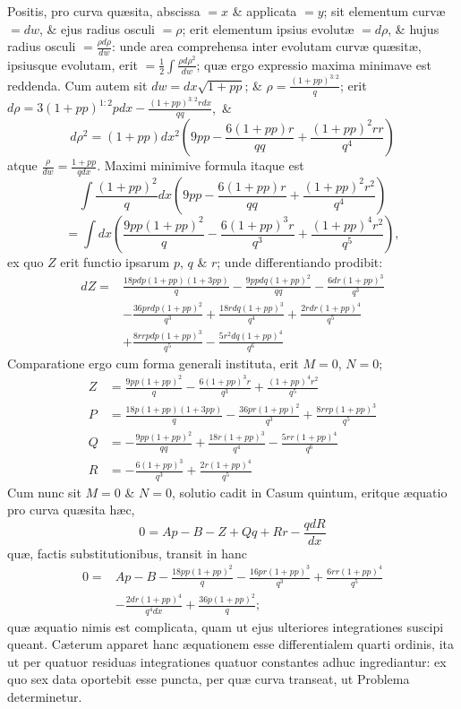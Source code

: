 Positis, pro curva quæsita, abscissa $=x$ \& applicata $=y$; sit elementum curvæ $=dw$, \& ejus radius osculi $=\rho$; erit elementum ipsius evolutæ $=d\rho$, \& hujus radius osculi $=\frac{\rho d\rho}{dw}$: unde area comprehensa inter evolutam curvæ quæsitæ, ipsiusque evolutam, erit $=\frac12\int\frac{\rho d\rho^2}{dw}$; quæ ergo expressio maxima minimave est reddenda. Cum autem sit $dw=dx\sqrt{1+pp}$; \& $\rho=\frac{(1+pp)^{3:2}}q$; erit $d\rho=3(1+pp)^{1:2}pdx-\frac{(1+pp)^{3:2}rdx}{qq}$,~\&
\[d\rho^2=(1+pp)dx^2\left(9pp-\frac{6(1+pp)r}{qq}+\frac{(1+pp)^2rr}{q^4}\right)\]
atque $\frac\rho{dw}=\frac{1+pp}{qdx}$. Maximi minimive formula itaque est
\[\int\frac{(1+pp)^2}{q}dx\left(9pp-\frac{6(1+pp)r}{qq}+\frac{(1+pp)^2r^2}{q^4}\right)\]
\[=\int dx\left(\frac{9pp(1+pp)^2}{q}-\frac{6(1+pp)^3r}{q^3}+\frac{(1+pp)^4r^2}{q^5}\right),\]
ex quo $Z$ erit functio ipsarum $p$, $q$ \& $r$; unde differentiando prodibit:
\[\begin{aligned}
dZ={}&\frac{18pdp(1+pp)(1+3pp)}q-\frac{9ppdq(1+pp)^2}{qq}-\frac{6dr(1+pp)^3}{q^3}\\
&-\frac{36prdp(1+pp)^2}{q^3}+\frac{18rdq(1+pp)^3}{q^4}+\frac{2rdr(1+pp)^4}{q^5}\\
&+\frac{8rrpdp(1+pp)^3}{q^5}-\frac{5r^2dq(1+pp)^4}{q^6}
\end{aligned}\]
Comparatione ergo cum forma generali instituta, erit $M=0$, $N=0$;
\[\begin{aligned}
Z&=\frac{9pp(1+pp)^2}{q}-\frac{6(1+pp)^3r}{q^3}+\frac{(1+pp)^4r^2}{q^5}\\
P&=\frac{18p(1+pp)(1+3pp)}q-\frac{36pr(1+pp)^2}{q^3}+\frac{8rrp(1+pp)^3}{q^5}\\
Q&=-\frac{9pp(1+pp)^2}{qq}+\frac{18r(1+pp)^3}{q^4}-\frac{5rr(1+pp)^4}{q^6}\\
R&=-\frac{6(1+pp)^3}{q^3}+\frac{2r(1+pp)^4}{q^5}
\end{aligned}\]
Cum nunc sit $M=0$ \& $N=0$, solutio cadit in Casum quintum, eritque æquatio pro curva quæsita hæc,
\[0=Ap-B-Z+Qq+Rr-\frac{qdR}{dx}\]
quæ, factis substitutionibus, transit in hanc
\[\begin{aligned}
0={}&Ap-B-\frac{18pp(1+pp)^2}{q}-\frac{16pr(1+pp)^3}{q^3}+\frac{6rr(1+pp)^4}{q^5}\\
&-\frac{2dr(1+pp)^4}{q^4dx}+\frac{36p(1+pp)^2}{q};
\end{aligned}\]
quæ æquatio nimis est complicata, quam ut ejus ulteriores integrationes suscipi queant. Cæterum apparet hanc æquationem esse differentialem quarti ordinis, ita ut per quatuor residuas integrationes quatuor constantes adhuc ingrediantur: ex quo sex data oportebit esse puncta, per quæ curva transeat, ut Problema determinetur.
